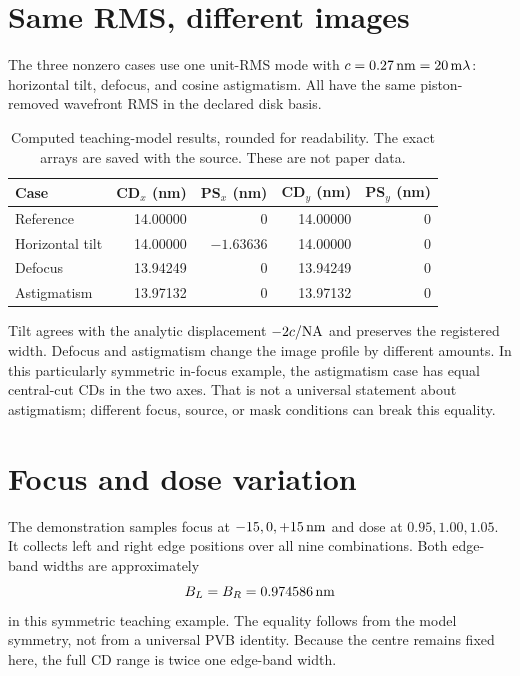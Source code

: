 \section{Same RMS, different images}
The three nonzero cases use one unit-RMS mode with
$c=0.27\,\mathrm{nm}=20\,\mathrm{m}\lambda$:
horizontal tilt, defocus, and cosine astigmatism.
All have the same piston-removed wavefront RMS in the declared disk basis.

\begin{table}[htbp]\centering\small
\caption{Computed teaching-model results, rounded for readability.
The exact arrays are saved with the source. These are not paper data.}
\begin{tabular}{@{}lrrrr@{}}
\toprule Case & CD$_x$ (nm) & PS$_x$ (nm)
& CD$_y$ (nm) & PS$_y$ (nm)\\ \midrule
Reference &14.00000&0&14.00000&0\\
Horizontal tilt &14.00000&$-1.63636$&14.00000&0\\
Defocus &13.94249&0&13.94249&0\\
Astigmatism &13.97132&0&13.97132&0\\
\bottomrule
\end{tabular}
\end{table}
Tilt agrees with the analytic displacement $-2c/\mathrm{NA}$ and preserves
the registered width. Defocus and astigmatism change the image profile
by different amounts.
In this particularly symmetric in-focus example, the astigmatism case
has equal central-cut CDs in the two axes. That is not a universal
statement about astigmatism; different focus, source, or mask conditions
can break this equality.


\section{Focus and dose variation}
The demonstration samples focus at $-15,0,+15\,\mathrm{nm}$ and dose at
$0.95,1.00,1.05$. It collects left and right edge positions over all
nine combinations.
Both edge-band widths are approximately
\[
B_L=B_R=0.974586\,\mathrm{nm}
\]
in this symmetric teaching example.
The equality follows from the model symmetry, not from a universal
PVB identity. Because the centre remains fixed here,
the full CD range is twice one edge-band width.

